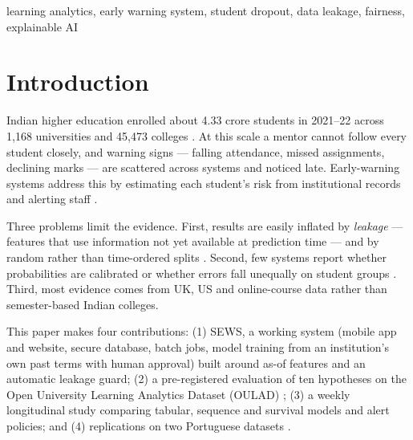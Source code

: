 \documentclass[conference]{IEEEtran}
\begin{document}
\begin{IEEEkeywords}
learning analytics, early warning system, student dropout, data leakage, fairness, explainable AI
\end{IEEEkeywords}

\section{Introduction}
Indian higher education enrolled about 4.33 crore students in 2021--22 across 1,168 universities and 45,473 colleges
\cite{aishe}. At this scale a mentor cannot follow every student closely, and warning signs --- falling attendance,
missed assignments, declining marks --- are scattered across systems and noticed late. Early-warning systems
address this by estimating each student's risk from institutional records and alerting staff \cite{arnold2012,
jayaprakash2014, herodotou2019}.

Three problems limit the evidence. First, results are easily inflated by \emph{leakage} --- features that use
information not yet available at prediction time --- and by random rather than time-ordered splits
\cite{kaufman2012, le2026}. Second, few systems report whether probabilities are calibrated or whether errors fall
unequally on student groups \cite{gardner2019, baker2022}. Third, most evidence comes from UK, US and online-course
data rather than semester-based Indian colleges.

This paper makes four contributions: (1) SEWS, a working system (mobile app and website, secure database, batch
jobs, model training from an institution's own past terms with human approval) built around as-of features and an
automatic leakage guard; (2) a pre-registered evaluation of ten hypotheses on the Open University Learning Analytics
Dataset (OULAD) \cite{kuzilek2017}; (3) a weekly longitudinal study comparing tabular, sequence and survival models
and alert policies; and (4) replications on two Portuguese datasets \cite{realinho2021, cortez2008}.
\end{document}
